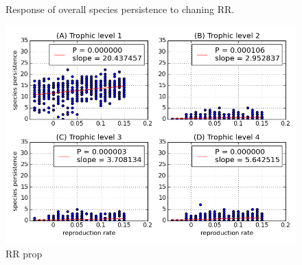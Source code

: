 \begin{figure}
	\centering	
	\renewcommand{\thesubfigure}{}
	\setlength{\subfloatlabelskip}{0pt}
	\caption{Response of overall species persistence to chaning RR.}
	\label{fig:rr_v_species_persistence}
\end{figure}


\begin{figure}
	\centering
	\includegraphics[width=1.0\linewidth]{"figures/rr_species_richness_per_trophic_level_mai00"}
	\caption{RR prop}
	\label{fig:rr_species_per_trophic_level_mai0}
\end{figure}

